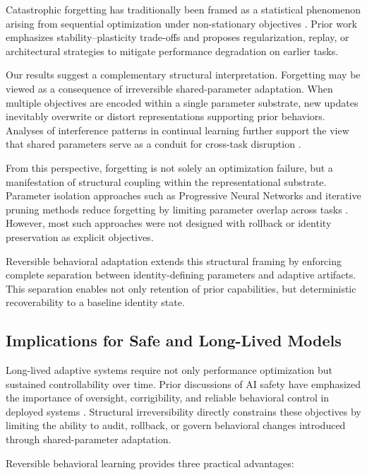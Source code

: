 \documentclass{article}
\begin{document}
	Catastrophic forgetting has traditionally been framed as a statistical phenomenon arising from sequential optimization under non-stationary objectives \cite{kirkpatrick2017ewc,delange2021continual}. Prior work emphasizes stability--plasticity trade-offs and proposes regularization, replay, or architectural strategies to mitigate performance degradation on earlier tasks.
	
	Our results suggest a complementary structural interpretation. Forgetting may be viewed as a consequence of irreversible shared-parameter adaptation. When multiple objectives are encoded within a single parameter substrate, new updates inevitably overwrite or distort representations supporting prior behaviors. Analyses of interference patterns in continual learning further support the view that shared parameters serve as a conduit for cross-task disruption \cite{kaushik2021rmn}.
	
	From this perspective, forgetting is not solely an optimization failure, but a manifestation of structural coupling within the representational substrate. Parameter isolation approaches such as Progressive Neural Networks and iterative pruning methods reduce forgetting by limiting parameter overlap across tasks \cite{rusu2016progressive,mallya2018packnet}. However, most such approaches were not designed with rollback or identity preservation as explicit objectives.
	
	Reversible behavioral adaptation extends this structural framing by enforcing complete separation between identity-defining parameters and adaptive artifacts. This separation enables not only retention of prior capabilities, but deterministic recoverability to a baseline identity state.
	
	\subsection{Implications for Safe and Long-Lived Models}
	\label{sec:analysis_implications}
	
	Long-lived adaptive systems require not only performance optimization but sustained controllability over time. Prior discussions of AI safety have emphasized the importance of oversight, corrigibility, and reliable behavioral control in deployed systems \cite{amodei2016concrete}. Structural irreversibility directly constrains these objectives by limiting the ability to audit, rollback, or govern behavioral changes introduced through shared-parameter adaptation.
	
	Reversible behavioral learning provides three practical advantages:
	
\end{document}

